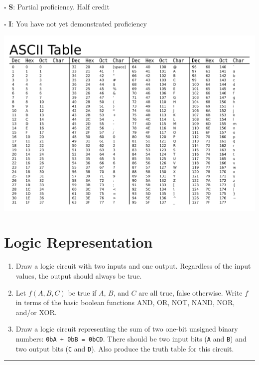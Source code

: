 \documentclass[12pt]{article}
\begin{document}
$\square$ \textbf{S}: Partial proficiency. Half credit

$\square$ \textbf{I}: You have not yet demonstrated proficiency

\newpage

\includegraphics[width=\textwidth]{wikimedia-ascii-table.png}

\newpage



\section*{Logic Representation}

\begin{enumerate}
\item Draw a logic circuit with two inputs and one output. Regardless of the input values, the output should always be true.
\vfill

\item Let $f(A, B, C)$ be true if $A$, $B$, and $C$ are all true, false otherwise. Write $f$ in terms of the basic boolean functions AND, OR, NOT, NAND, NOR, and/or XOR. 
\vfill

\item Draw a logic circuit representing the sum of two one-bit unsigned binary numbers: \texttt{0bA + 0bB = 0bCD}. There should be two input bits (\texttt{A} and \texttt{B}) and two output bits (\texttt{C} and \texttt{D}). Also produce the truth table for this circuit.
\vfill
\end{enumerate}

\vfill

\rule[1ex]{\textwidth}{.1pt}
\end{document}
